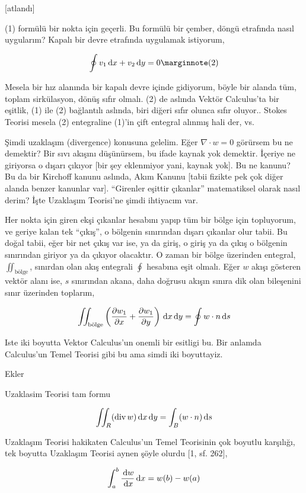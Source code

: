 \documentclass[12pt,fleqn]{article}\usepackage{../../common}
\begin{document}
[atlandı]

(1) formülü bir nokta için geçerli. Bu formülü bir çember, döngü etrafında
nasıl uygularım? Kapalı bir devre etrafında uygulamak istiyorum,

$$
\oint v_1 \ud x + v_2 \ud y = 0
\mlabel{2}
$$
 
Mesela bir hız alanında bir kapalı devre içinde gidiyorum, böyle bir alanda tüm,
toplam sirkülasyon, dönüş sıfır olmalı. (2) de aslında Vektör Calculus'ta bir
eşitlik, (1) ile (2) bağlantılı aslında, biri diğeri sıfır olunca sıfır oluyor..
Stokes Teorisi mesela (2) entegraline (1)'in çift entegral alınmış hali der, vs.

Şimdi uzaklaşım (divergence) konusuna gelelim. Eğer $\nabla \cdot w = 0$
görürsem bu ne demektir? Bir sıvı akışını düşünürsem, bu ifade kaynak yok
demektir. İçeriye ne giriyorsa o dışarı çıkıyor [bir şey eklenmiyor yani, kaynak
yok]. Bu ne kanunu? Bu da bir Kirchoff kanunu aslında, Akım Kanunu [tabii
fizikte pek çok diğer alanda benzer kanunlar var]. ``Girenler eşittir çıkanlar''
matematiksel olarak nasıl derim? İşte Uzaklaşım Teorisi'ne şimdi ihtiyacım var.

Her nokta için giren ekşi çıkanlar hesabını yapıp tüm bir bölge için topluyorum,
ve geriye kalan tek ``çıkış'', o bölgenin sınırından dışarı çıkanlar olur tabii.
Bu doğal tabii, eğer bir net çıkış var ise, ya da giriş, o giriş ya da çıkış o
bölgenin sınırından giriyor ya da çıkıyor olacaktır. O zaman bir bölge üzerinden
entegral, $\iint_{\textrm{bölge}}$, sınırdan olan akış entegrali $\oint$
hesabına eşit olmalı. Eğer $w$ akışı gösteren vektör alanı ise, $s$ sınırından
akana, daha doğrusu akışın sınıra dik olan bileşenini sınır üzerinden toplarım,

$$
\iint_{\textrm{bölge}} \left( 
\frac{\partial w_1}{\partial x} +
\frac{\partial w_1}{\partial y}   \right)
\,\mathrm{d} x \,\mathrm{d} y =
\oint w \cdot n \,\mathrm{d} s
$$

Iste iki boyutta Vektor Calculus'un onemli bir esitligi bu. Bir anlamda
Calculus'un Temel Teorisi gibi bu ama simdi iki boyuttayiz.

Ekler

Uzaklasim Teorisi tam formu

$$
\iint_R (\operatorname{div} w) \,\mathrm{d} x \,\mathrm{d} y = \int_B  ( w \cdot n ) \,\mathrm{d} s
$$

Uzaklaşım Teorisi hakikaten Calculus'un Temel Teorisinin çok boyutlu karşılığı,
tek boyutta Uzaklaşım Teorisi aynen şöyle olurdu [1, sf. 262],

$$
\int _{a}^{b} \frac{\,\mathrm{d} w}{\,\mathrm{d} x} \,\mathrm{d} x = w(b) - w(a)
$$
\end{document}
